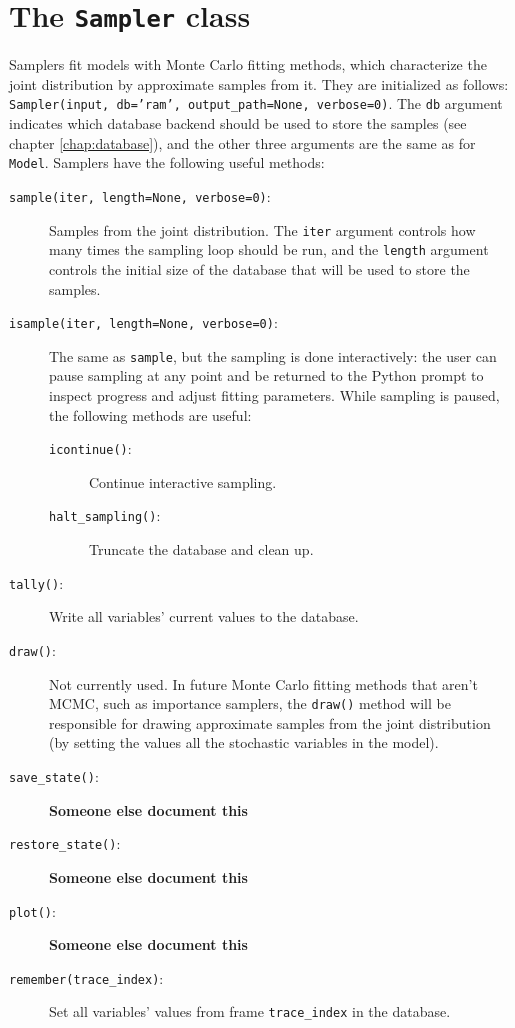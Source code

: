 \section{The \texttt{Sampler} class} 
Samplers fit models with Monte Carlo fitting methods, which characterize the joint distribution by approximate samples from it. They are initialized as follows: \texttt{Sampler(input, db='ram', output\_path=None, verbose=0)}. The \texttt{db} argument indicates which database backend should be used to store the samples (see chapter \ref{chap:database}), and the other three arguments are the same as for \texttt{Model}. Samplers have the following useful methods:
\begin{description}
    \item[\texttt{sample(iter, length=None, verbose=0)}:] Samples from the joint distribution. The \texttt{iter} argument controls how many times the sampling loop should be run, and the \texttt{length} argument controls the initial size of the database that will be used to store the samples.
    \item[\texttt{isample(iter, length=None, verbose=0)}:] The same as \texttt{sample}, but the sampling is done interactively: the user can pause sampling at any point and be returned to the Python prompt to inspect progress and adjust fitting parameters. While sampling is paused, the following methods are useful: 
    \begin{description}
        \item[\texttt{icontinue()}:] Continue interactive sampling.
        \item[\texttt{halt\_sampling()}:] Truncate the database and clean up.
    \end{description}
    \item[\texttt{tally()}:] Write all variables' current values to the database.
    \item[\texttt{draw()}:] Not currently used. In future Monte Carlo fitting methods that aren't MCMC, such as importance samplers, the \texttt{draw()} method will be responsible for drawing approximate samples from the joint distribution (by setting the values all the stochastic variables in the model).
    \item[\texttt{save\_state()}:] \textbf{Someone else document this}
    \item[\texttt{restore\_state()}:] \textbf{Someone else document this}
    \item[\texttt{plot()}:] \textbf{Someone else document this}
    \item[\texttt{remember(trace\_index)}:] Set all variables' values from frame \texttt{trace\_index} in the database.
\end{description}

